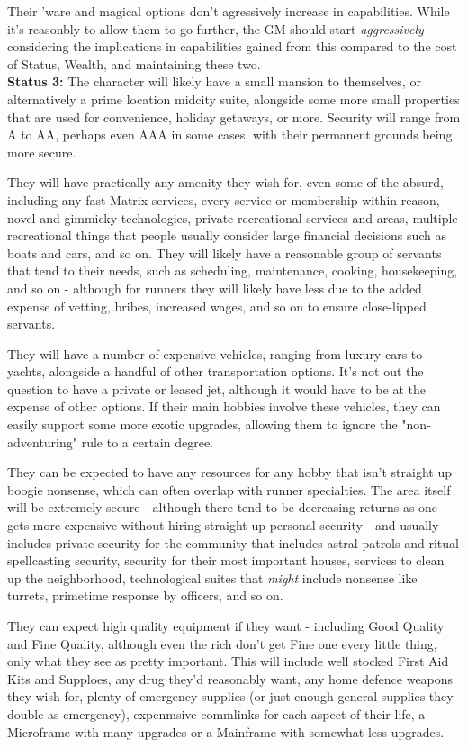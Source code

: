 \begin{multicols*}{2}
	Their 'ware and magical options don't agressively increase in capabilities. While it's reasonbly to allow them to go further, the GM should start \textit{aggressively} considering the implications in capabilities gained from this compared to the cost of Status, Wealth, and maintaining these two.\\
	
	\textbf{Status 3:} The character will likely have a small mansion to themselves, or alternatively a prime location midcity suite, alongside some more small properties that are used for convenience, holiday getaways, or more. Security will range from A to AA, perhaps even AAA in some cases, with their permanent grounds being more secure.
	
	They will have practically any amenity they wish for, even some of the absurd, including any fast Matrix services, every service or membership within reason, novel and gimmicky technologies, private recreational services and areas, multiple recreational things that people usually consider large financial decisions such as boats and cars, and so on. They will likely have a reasonable group of servants that tend to their needs, such as scheduling, maintenance, cooking, housekeeping, and so on - although for runners they will likely have less due to the added expense of vetting, bribes, increased wages, and so on to ensure close-lipped servants.
	
	They will have a number of expensive vehicles, ranging from luxury cars to yachts, alongside a handful of other transportation options. It's not out the question to have a private or leased jet, although it would have to be at the expense of other options. If their main hobbies involve these vehicles, they can easily support some more exotic upgrades, allowing them to ignore the "non-adventuring" rule to a certain degree.
	
	They can be expected to have any resources for any hobby that isn't straight up boogie nonsense, which can often overlap with runner specialties. The area itself will be extremely secure - although there tend to be decreasing returns as one gets more expensive without hiring straight up personal security - and usually includes private security for the community that includes astral patrols and ritual spellcasting security, security for their most important houses, services to clean up the neighborhood, technological suites that \textit{might} include nonsense like turrets, primetime response by officers, and so on.
	
	They can expect high quality equipment if they want - including Good Quality and Fine Quality, although even the rich don't get Fine one every little thing, only what they see as pretty important. This will include well stocked First Aid Kits and Supploes, any drug they'd reasonably want, any home defence weapons they wish for, plenty of emergency supplies (or just enough general supplies they double as emergency), expenmsive commlinks for each aspect of their life, a Microframe with many upgrades or a Mainframe with somewhat less upgrades. 
	

\end{multicols*}
